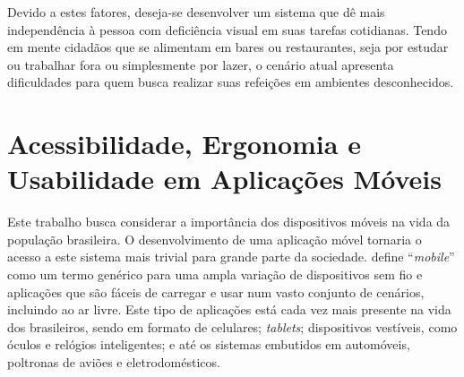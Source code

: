 Devido a estes fatores, deseja-se desenvolver um sistema que dê mais independência à pessoa com deficiência visual em suas tarefas cotidianas. Tendo em mente cidadãos que se alimentam em bares ou restaurantes, seja por estudar ou trabalhar fora ou simplesmente por lazer, o cenário atual apresenta dificuldades para quem busca realizar suas refeições em ambientes desconhecidos. 

\section{Acessibilidade, Ergonomia e Usabilidade em Aplicações Móveis}
Este trabalho busca considerar a importância dos dispositivos móveis na vida da população brasileira. O desenvolvimento de uma aplicação móvel tornaria o acesso a este sistema mais trivial para grande parte da sociedade. \cite{WCAG20} define “\emph{mobile}” como um termo genérico para uma ampla variação de dispositivos sem fio e aplicações que são fáceis de carregar e usar num vasto conjunto de cenários, incluindo ao ar livre. Este tipo de aplicações está cada vez mais presente na vida dos brasileiros, sendo em formato de celulares; \emph{tablets}; dispositivos vestíveis, como óculos e relógios inteligentes; e até os sistemas embutidos em automóveis, poltronas de aviões e eletrodomésticos.

